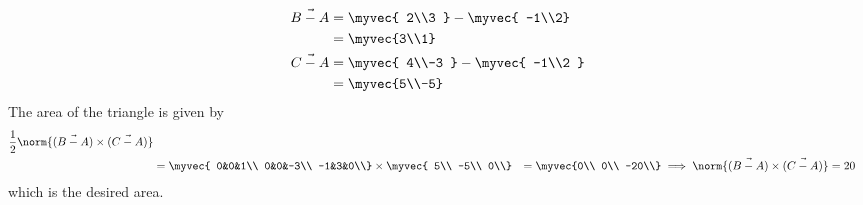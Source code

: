 \begin{align}
    \Vec{B-A} &=\myvec{
    2\\3
    } -\myvec{
    -1\\2}
\\ \label{3/4/5/eq1}
&= \myvec{3\\1}
\\ \Vec{C-A} &=\myvec{
4\\-3
} -\myvec{
-1\\2 }
\\
\label{3/4/5/eq2}
&= \myvec{5\\-5}
\end{align}
The area of the triangle is given by 
\begin{align} \label{3/4/5/eq3}
\frac{1}{2}\norm {(\Vec{B-A})\times ( \Vec{C-A}) }
 \label{3/4/5/eq4}

\\ &=    \myvec{
    0&0&1\\
    0&0&-3\\
   -1&3&0\\}
    \times \myvec{
    5\\
    -5\\
    0\\}
    &= \myvec{0\\
   0\\
    -20\\}
\implies \norm {\Vec{(B-A)}\times  \Vec{(C-A)} } & = 20
\end{align}
which is the desired area.

